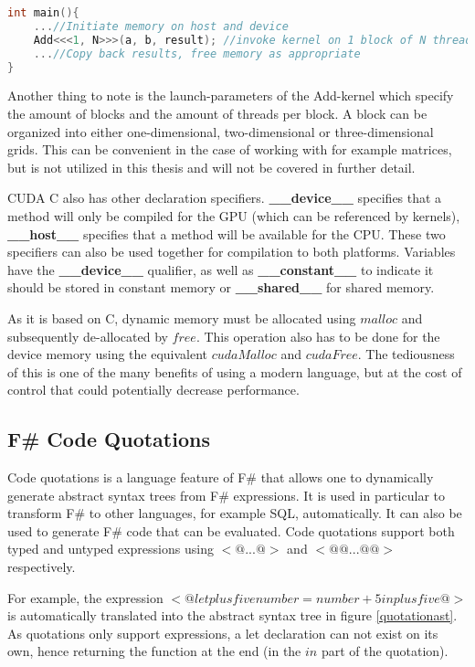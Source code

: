 {\begin{lstlisting}[language=C++, caption=CUDA C addition kernel, label=cuda_add]
int main(){
	...//Initiate memory on host and device
	Add<<<1, N>>>(a, b, result); //invoke kernel on 1 block of N threads
	...//Copy back results, free memory as appropriate
}
\end{lstlisting}

Another thing to note is the launch-parameters of the Add-kernel which specify the amount of blocks and the amount of threads per block. A block can be organized into either one-dimensional, two-dimensional or three-dimensional grids. This can be convenient in the case of working with for example matrices, but is not utilized in this thesis and will not be covered in further detail.

CUDA C also has other declaration specifiers. \textbf{\_\_device\_\_} specifies that a method will only be compiled for the GPU (which can be referenced by kernels), \textbf{\_\_host\_\_} specifies that a method will be available for the CPU. These two specifiers can also be used together for compilation to both platforms.
Variables have the \textbf{\_\_device\_\_} qualifier, as well as \textbf{\_\_constant\_\_} to indicate it should be stored in constant memory or \textbf{\_\_shared\_\_} for shared memory.

As it is based on C, dynamic memory must be allocated using $malloc$ and subsequently de-allocated by $free$.
This operation also has to be done for the device memory using the equivalent $cudaMalloc$ and $cudaFree$.
The tediousness of this is one of the many benefits of using a modern language, but at the cost of control that could potentially decrease performance.

\subsection{F\# Code Quotations}
Code quotations is a language feature of F\# that allows one to dynamically generate abstract syntax trees from F\# expressions. It is used in particular to transform F\# to other languages, for example SQL, automatically. It can also be used to generate F\# code that can be evaluated. Code quotations support both typed and untyped expressions using $<@ ... @>$ and $<@@ ... @@>$ respectively.

For example, the expression $<@ let plusfive number = number + 5 in plusfive @>$ is automatically translated into the abstract syntax tree in figure \ref{quotationast}. As quotations only support expressions, a let declaration can not exist on its own, hence returning the function at the end (in the $in$ part of the quotation).

}
